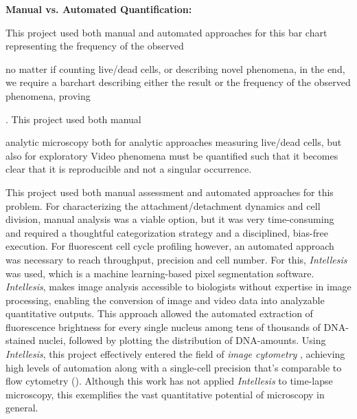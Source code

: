 \textbf{Manual vs. Automated Quantification:}

This project used both manual and automated approaches for this
bar chart representing the frequency of the observed

no matter if counting live/dead cells, or describing
novel phenomena, in the end, we require a barchart describing either the result
or the frequency of the observed phenomena, proving 

. This project used both manual

analytic microscopy 
both for analytic approaches measuring live/dead cells, but also for
exploratory
Video phenomena must be quantified such that it becomes clear that it is
reproducible and not a singular occurrence.

This
project used both manual assessment and automated approaches for this problem.
For characterizing the attachment/detachment dynamics and cell division, manual
analysis was a viable option, but it was very time-consuming and required a
thoughtful categorization strategy and a disciplined, bias-free execution. For
fluorescent cell cycle profiling however, an automated approach was necessary to
reach throughput, precision and cell number. For this, \textit{Intellesis} was
used, which is a machine learning-based pixel segmentation software.
\textit{Intellesis}, makes image analysis accessible to biologists without
expertise in image processing, enabling the conversion of image and video data
into analyzable quantitative outputs. This approach allowed the automated
extraction of fluorescence brightness for every single nucleus among tens of
thousands of DNA-stained nuclei, followed by plotting the distribution of
DNA-amounts. Using \textit{Intellesis}, this project effectively entered the
field of \emph{image cytometry} \cite{guptaDeepLearningImage2019}, achieving
high levels of automation along with a single-cell precision that's comparable
to flow cytometry (). Although this work has not
applied \textit{Intellesis} to time-lapse microscopy, this exemplifies the vast
quantitative potential of microscopy 
in general.


